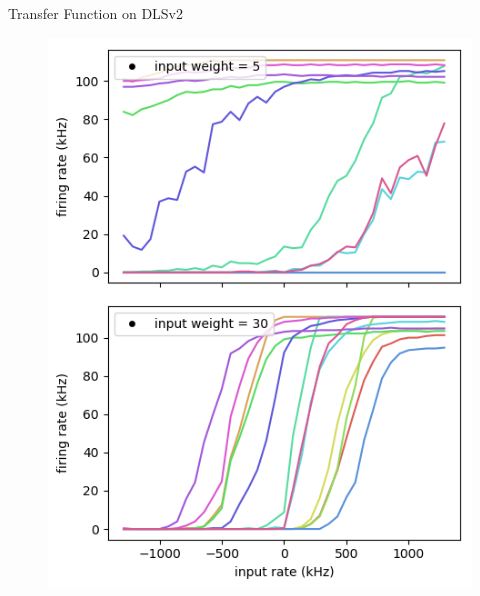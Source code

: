 \documentclass[12pt, aspectratio=169]{beamer}
\begin{document}
\begin{frame}{Transfer Function on DLSv2}
    \centering
            \begin{figure}
                \includegraphics[scale=0.48]{mfp/uncalibrated_activation_function_input.png}
                \label{membrane_potential}
            \end{figure}
\end{frame}
\end{document}
